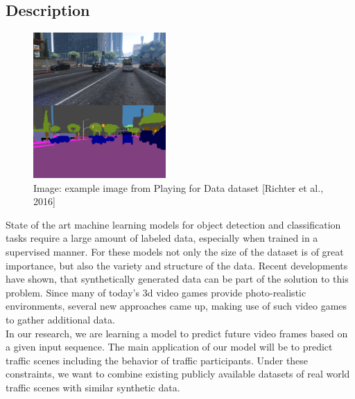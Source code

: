 \documentclass[lang=english]{tumposting}
\title{\raggedright {\Huge{{\color{tumblue}{Generating Datasets from Video Games}}}}}
\date{}
\begin{document}
	
\pagestyle{empty}

\maketitle
	
	
	

\vspace*{-20mm}
\subsection{Description}
\begin{figure}
	\includegraphics[width=0.45\textwidth]{PlayingForData}
	\caption[]{{\tiny{Image: example image from Playing for Data dataset [Richter et al., 2016]}}}
\end{figure}
State of the art machine learning models for object detection and classification tasks require a large amount of labeled data, especially when trained in a supervised manner. 
For these models not only the size of the dataset is of great importance, but also the variety and structure of the data. 
Recent developments have shown, that synthetically generated data can be part of the solution to this problem.
Since many of today's 3d video games provide photo-realistic environments, several new approaches came up, making use of such video games to gather additional data. \\

\noindent
In our research, we are learning a model to predict future video frames based on a given input sequence.
The main application of our model will be to predict traffic scenes including the behavior of traffic participants.
Under these constraints, we want to combine existing publicly available datasets of real world traffic scenes with similar synthetic data. \\
\end{document}
